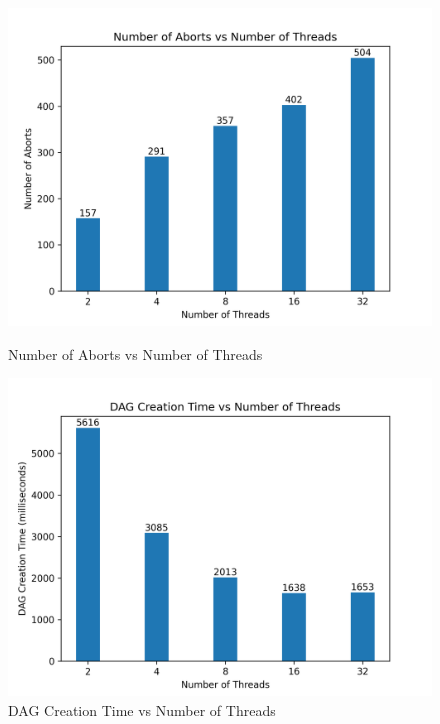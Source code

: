 \documentclass[12pt]{article}
\begin{document}
\begin{figure}[h]
    \centering
    \begin{minipage}
        {0.49\textwidth}
        \includegraphics[width=\textwidth]{images/numThreads_vs_Aborts.png}
        \caption{Number of Aborts vs Number of Threads}
        \label{fig:numThreads_vs_Aborts}
    \end{minipage}
    \hfill
    \begin{minipage}
        {0.49\textwidth}
        \includegraphics[width=\textwidth]{images/numThreads_vs_DAGCreationTime.png}
        \caption{DAG Creation Time vs Number of Threads}
        \label{fig:numThreads_vs_DAGCreationTime}
    \end{minipage}
\end{figure}
\end{document}
